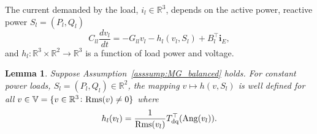 \documentclass[journal, final, letterpaper]{IEEEtran}
\newtheorem{lemma}[theorem]{Lemma}
\newcommand{\ts}[1]{{\textnormal{#1}}}
\newcommand{\Rset}{\mathbb{R}}
\newcommand{\mb}{\mathbf}
\newcommand{\mbb}{\mathbb}
\begin{document}
The current demanded by the load, $i_{l}\in\Rset^{3}$, depends on the active power, reactive power $S_l = (P_l,Q_l)$
%
\begin{equation}
  	C_{ll}\frac{dv_{l}}{dt}= -G_{ll} v_{l} - h_l(v_l,S_l) + B_l^\top\mb{i}_{E},
\label{eq:load_voltage}
\end{equation}
%
and $h_l\colon\Rset^{3}\times\Rset^{2}\rightarrow\Rset^{3}$ is a function of load power and voltage.
%
\begin{lemma}
	Suppose Assumption~\ref{asssump:MG_balanced} holds. For constant power loads, $S_l=(P_l,Q_l)\in\Rset^{2}$, the mapping $v\mapsto h(v,S_l)$ is well defined for all $v\in\mbb{V}= \{v\in\Rset^3\colon \ts{Rms}(v) \neq 0\}$ where
	\begin{equation}
		h_l(v_l) = \frac{1}{\ts{Rms}(v_l)}T_\ts{dq}^\top(\ts{Ang}(v_l)).
	\label{eq:cpl_current}  
	\end{equation}
	\label{lem:cpl_current}


\end{lemma}



\appendix
%
%
\end{document}
